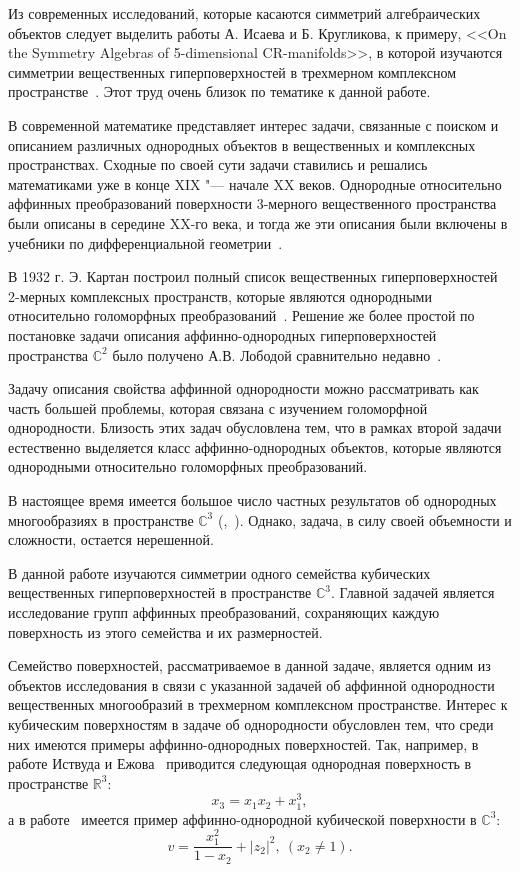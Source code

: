 \documentclass[../main.tex]{subfiles}
\begin{document}
Из современных исследований, которые касаются симметрий алгебраических объектов следует выделить работы А. Исаева и Б. Кругликова, к примеру, <<On the Symmetry Algebras of 5-dimensional CR-manifolds>>, в которой изучаются симметрии вещественных гиперповерхностей в трехмерном комплексном пространстве~\cite{IK}. Этот труд очень близок по тематике к данной работе.

В современной математике представляет интерес задачи, связанные с поиском и описанием различных однородных объектов в вещественных и комплексных пространствах. Сходные по своей сути задачи ставились и решались математиками уже в конце XIX "--- начале XX веков. Однородные относительно аффинных преобразований поверхности 3-мерного вещественного пространства были описаны в середине XX-го века, и тогда же эти описания были включены в учебники по дифференциальной геометрии~\cite{shirokov}.

В 1932 г. Э. Картан построил полный список вещественных гиперповерхностей 2-мерных комплексных пространств, которые являются однородными относительно голоморфных преобразований~\cite{cartan}. Решение же более простой по постановке задачи описания аффинно-однородных гиперповерхностей пространства $\mathbb{C}^2$ было получено А.В. Лободой сравнительно недавно~\cite{loboda_book}.

Задачу описания свойства аффинной однородности можно рассматривать как часть большей проблемы, которая связана с изучением голоморфной однородности. Близость этих задач обусловлена тем, что в рамках второй задачи естественно выделяется класс аффинно-однородных объектов, которые являются однородными относительно голоморфных преобразований.

В настоящее время имеется большое число частных результатов об однородных многообразиях в пространстве $\mathbb{C}^3$ (\cite{ALS},~\cite{loboda_hodarev}). Однако, задача, в силу своей объемности и сложности, остается нерешенной.


В данной работе изучаются симметрии одного семейства кубических вещественных гиперповерхностей в пространстве $\mathbb{C}^3$. Главной задачей является исследование групп аффинных преобразований, сохраняющих каждую поверхность из этого семейства и их размерностей.

Семейство поверхностей, рассматриваемое в данной задаче, является одним из объектов исследования в связи с указанной задачей об аффинной однородности вещественных многообразий в трехмерном комплексном пространстве. Интерес к кубическим поверхностям в задаче об однородности обусловлен тем, что среди них имеются примеры аффинно-однородных поверхностей. Так, например, в работе Иствуда и Ежова~\cite{eastwood} приводится следующая однородная поверхность в пространстве $\mathbb{R}^3$:
$$
x_3 = x_1 x_2 + x_1^3,
$$
а в работе~\cite{ALS} имеется пример аффинно-однородной кубической поверхности в $\mathbb{C}^3$:
$$
v = \frac{x_1^2}{1 - x_2} + |z_2|^2,\ (x_2 \ne 1).
$$
\end{document}
